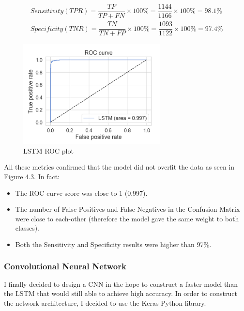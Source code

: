 \begin{align}
\ Sensitivity (TPR) = \dfrac{TP}{TP + FN}\times100\% = \dfrac{1144}{1166}\times100\% = 98.1\% \label{eq:1} \\
\ Specificity (TNR)  = \dfrac{TN}{TN + FP}\times100\%
= \dfrac{1093}{1122}\times100\% = 97.4\%
\end{align}

\begin{figure}[ht!]%
    \centering
    \includegraphics[width=7.5cm]{images/lstmorc.PNG}%
    \caption{LSTM ROC plot}
\end{figure}

All these metrics confirmed that the model did not overfit the data as seen in Figure 4.3. In fact: 
\begin{itemize}
\itemsep0em
\item The ROC curve score was close to 1 (0.997).
\item The number of False Positives and False Negatives in the Confusion Matrix were close to each-other (therefore the model gave the same weight to both classes).
\item Both the Sensitivity and Specificity results were higher than 97\%.
\end{itemize}

\subsubsection{Convolutional Neural Network}
I finally decided to design a CNN in the hope to construct a faster model than the LSTM that would still able to achieve high accuracy. In order to construct the network architecture, I decided to use the Keras Python library. 

